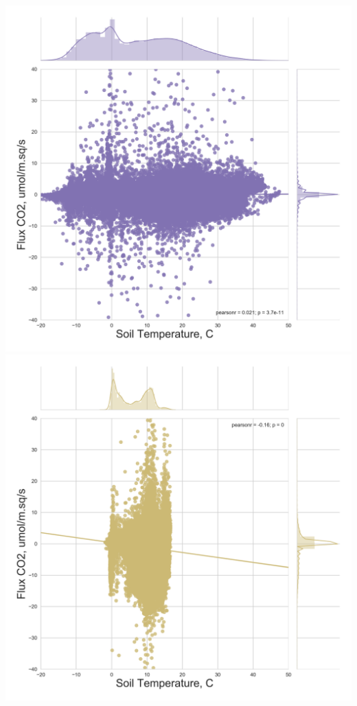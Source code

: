\documentclass{beamer}
\begin{document}
\begin{frame}
\begin{columns}[t]
\centering
\includegraphics[width=\textwidth]{FvsT/US-FPe.png}\\
\includegraphics[width=\textwidth]{FvsT/US-Los.png}
\end{columns}

\end{frame}
\end{document}
